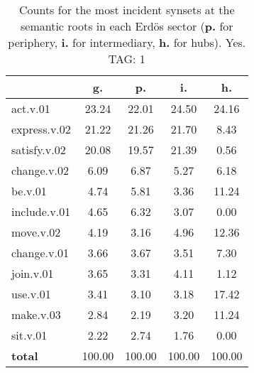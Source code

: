 \begin{table}[h!]
\begin{center}
\begin{tabular}{| l || c | c | c | c |}\hline
 & {\bf g.} & {\bf p.} & {\bf i.} & {\bf h.} \\\hline\hline
act.v.01 & 23.24  & 22.01  & 24.50  & 24.16 \\\hline
express.v.02 & 21.22  & 21.26  & 21.70  & 8.43 \\\hline
satisfy.v.02 & 20.08  & 19.57  & 21.39  & 0.56 \\\hline
change.v.02 & 6.09  & 6.87  & 5.27  & 6.18 \\\hline
be.v.01 & 4.74  & 5.81  & 3.36  & 11.24 \\\hline
include.v.01 & 4.65  & 6.32  & 3.07  & 0.00 \\\hline
move.v.02 & 4.19  & 3.16  & 4.96  & 12.36 \\\hline
change.v.01 & 3.66  & 3.67  & 3.51  & 7.30 \\\hline
join.v.01 & 3.65  & 3.31  & 4.11  & 1.12 \\\hline
use.v.01 & 3.41  & 3.10  & 3.18  & 17.42 \\\hline
make.v.03 & 2.84  & 2.19  & 3.20  & 11.24 \\\hline
sit.v.01 & 2.22  & 2.74  & 1.76  & 0.00 \\\hline\hline
{{\bf total}} & 100.00  & 100.00  & 100.00  & 100.00 \\\hline
\end{tabular}
\caption{Counts for the most incident synsets at the semantic roots in each Erd\"os sector ({\bf p.} for periphery, {\bf i.} for intermediary, {\bf h.} for hubs). Yes. TAG: 1}
\end{center}
\end{table}